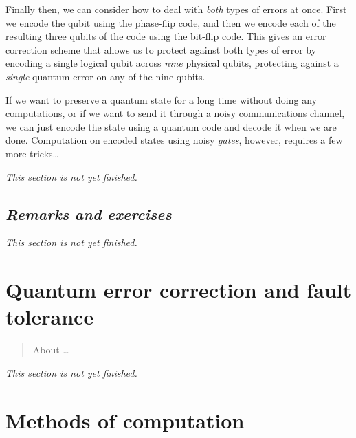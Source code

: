 \documentclass[fleqn,a4paper]{article}
\newenvironment{todo}{\color{primary}\emph{This section is not yet finished.}}{}
\let\oldsection\section
\renewcommand\section{\clearpage\oldsection}
\theoremstyle{definition}
\theoremstyle{definition}
\theoremstyle{definition}
\theoremstyle{definition}
\theoremstyle{remark}
\begin{document}
Finally then, we can consider how to deal with \emph{both} types of errors at once.
First we encode the qubit using the phase-flip code, and then we encode each of the resulting three qubits of the code using the bit-flip code.
This gives an error correction scheme that allows us to protect against both types of error by encoding a single logical qubit across \emph{nine} physical qubits, protecting against a \emph{single} quantum error on any of the nine qubits.

If we want to preserve a quantum state for a long time without doing any computations, or if we want to send it through a noisy communications channel, we can just encode the state using a quantum code and decode it when we are done.
Computation on encoded states using noisy \emph{gates}, however, requires a few more tricks\ldots{}

\begin{todo}

\end{todo}

\hypertarget{remarks-and-exercises-decoherence}{%
\subsection{\texorpdfstring{\emph{Remarks and exercises}}{Remarks and exercises}}\label{remarks-and-exercises-decoherence}}

\begin{todo}

\end{todo}

\hypertarget{quantum-error-correction-and-fault-tolerance}{%
\section{Quantum error correction and fault tolerance}\label{quantum-error-correction-and-fault-tolerance}}

\begin{quote}
About \ldots{}
\end{quote}

\begin{todo}

\end{todo}

\hypertarget{methods-of-computation}{%
\section{Methods of computation}\label{methods-of-computation}}
\end{document}
